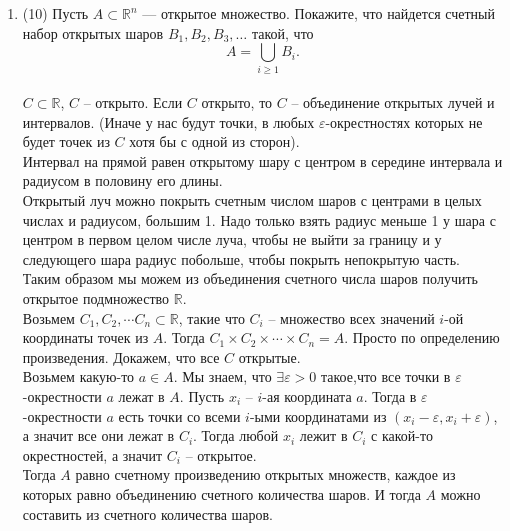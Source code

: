 \documentclass[a4paper]{article}
\def\eps{\varepsilon}
\begin{document}
\begin{enumerate}
    \item (10) Пусть $A\subset \mathbb R^n$ --- открытое множество. Покажите, что найдется счетный набор открытых шаров $B_1,B_2,B_3,\dots$ такой, что
    \[
        A = \bigcup_{i\geq 1} B_i.
    \]\\
    $C\subset \mathbb R$, $C$ -- открыто. Если $C$ открыто, то $C$ -- объединение открытых лучей и интервалов. (Иначе у нас будут точки, в любых $\eps$-окрестностях которых не будет точек из $C$ хотя бы с одной из сторон).\\
    Интервал на прямой равен открытому шару с центром в середине интервала и радиусом в половину его длины.\\
    Открытый луч можно покрыть счетным числом шаров с центрами в целых числах и радиусом, большим 1. Надо только взять радиус меньше 1 у шара с центром в первом целом числе луча, чтобы не выйти за границу и у следующего шара радиус побольше, чтобы покрыть непокрытую часть.\\
    Таким образом мы можем из объединения счетного числа шаров получить открытое подмножество $\mathbb R$.\\
    Возьмем $C_1, C_2, \cdots C_n \subset \mathbb R$, такие что $C_i$ -- множество всех значений $i$-ой координаты точек из $A$. Тогда $C_1\times C_2\times \cdots\times C_n = A$. Просто по определению произведения. Докажем, что все $C$ открытые.\\
    Возьмем какую-то $a \in A$. Мы знаем, что $\exists \eps > 0$ такое,что все точки в $\eps$-окрестности $a$ лежат в $A$. Пусть $x_i$ -- $i$-ая координата $a$. Тогда в $\eps$-окрестности $a$ есть точки со всеми $i$-ыми координатами из $(x_i-\eps, x_i+\eps)$, а значит все они лежат в $C_i$. Тогда любой $x_i$ лежит в $C_i$ с какой-то окрестностей, а значит $C_i$ -- открытое.\\
    Тогда $A$ равно счетному произведению открытых множеств, каждое из которых равно объединению счетного количества шаров. И тогда $A$ можно составить из счетного количества шаров.
    

\end{enumerate}
\end{document}
